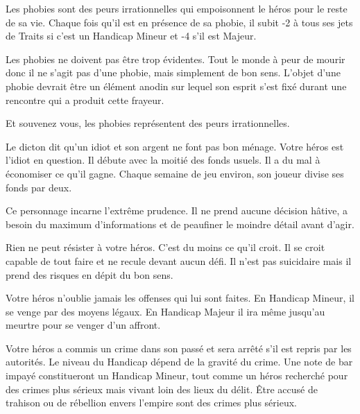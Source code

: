 \begin{description}[align=left]
    \item [Phobie (Mineur ou Majeur)]
        Les phobies sont des peurs irrationnelles qui empoisonnent le héros pour le reste de sa vie. Chaque fois qu'il est en présence de sa phobie, il subit -2 à tous ses jets de Traits si c'est un Handicap Mineur et -4 s'il est Majeur. 

        Les phobies ne doivent pas être trop évidentes. Tout le monde à peur de mourir donc il ne s'agit pas d'une phobie, mais simplement de bon sens. L'objet d'une phobie devrait être un élément anodin sur lequel son esprit s'est fixé durant une rencontre qui a produit cette frayeur.

        Et souvenez vous, les phobies représentent des peurs irrationnelles.

    \item [Poches percées (Mineur)]
        Le dicton dit qu'un idiot et son argent ne font pas bon ménage. Votre héros est l'idiot en question. Il débute avec la moitié des fonds usuels. Il a du mal à économiser ce qu'il gagne. Chaque semaine de jeu environ, son joueur divise ses fonds par deux.

    \item [Prudent (Mineur)]
        Ce personnage incarne l'extrême prudence. Il ne prend aucune décision hâtive, a besoin du maximum d'informations et de peaufiner le moindre détail avant d'agir.

    \item [Présomptueux (Majeur)]
        Rien ne peut résister à votre héros. C'est du moins ce qu'il croit. Il se croit capable de tout faire et ne recule devant aucun défi. Il n'est pas suicidaire mais il prend des risques en dépit du bon sens.

    \item [Rancunier (Mineur ou Majeur)]
        Votre héros n'oublie jamais les offenses qui lui sont faites. En Handicap Mineur, il se venge par des moyens légaux. En Handicap Majeur il ira même jusqu'au meurtre pour se venger d'un affront.

    \item [Recherché (Mineur ou Majeur)]
        Votre héros a commis un crime dans son passé et sera arrêté s'il est repris par les autorités. Le niveau du Handicap dépend de la gravité du crime. Une note de bar impayé constitueront un Handicap Mineur, tout comme un héros recherché pour des crimes plus sérieux mais vivant loin des lieux du délit. Être accusé de trahison ou de rébellion envers l'empire sont des crimes plus sérieux.


\end{description}
